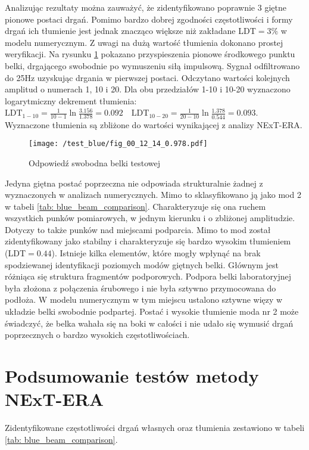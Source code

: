 Analizując rezultaty można zauważyć, że zidentyfikowano poprawnie 3 giętne pionowe postaci drgań. Pomimo bardzo dobrej zgodności częstotliwości i formy drgań ich tłumienie jest jednak znacząco większe niż zakładane LDT$=3\%$ w modelu numerycznym. Z uwagi na dużą wartość tłumienia dokonano prostej weryfikacji. Na rysunku \ref{fig: blue_beam_natural_vib} pokazano przyspieszenia pionowe środkowego punktu belki, drgającego swobodnie po wymuszeniu siłą impulsową. 
Sygnał odfiltrowano do 25Hz uzyskując drgania w pierwszej postaci. Odczytano wartości kolejnych amplitud o numerach 1, 10 i 20. Dla obu przedziałów 1-10 i 10-20 wyznaczono logarytmiczny dekrement tłumienia: $\textrm{LDT}_{1-10} = \frac{1}{10-1} \ln{\frac{3.156}{1.378}}=0.092 \quad
\textrm{LDT}_{10-20}=\frac{1}{20-10}\ln{\frac{1.378}{0.544}}=0.093$. Wyznaczone tłumienia są zbliżone do wartości wynikającej z analizy NExT-ERA.


\begin{figure}[h]
	\centering
	\texttt{[image: /test\_blue/fig\_00\_12\_14\_0.978.pdf]}
	\captionsetup{justification=centering}
	\caption{Odpowiedź swobodna belki testowej}
	\label{fig: blue_beam_natural_vib}
\end{figure}


 Jedyna giętna postać poprzeczna nie odpowiada strukturalnie żadnej z wyznaczonych w analizach numerycznych. Mimo to sklasyfikowano ją jako mod 2 w tabeli \ref{tab: blue_beam_comparison}. Charakteryzuje się ona ruchem wszystkich punków pomiarowych, w jednym kierunku i o zbliżonej amplitudzie. Dotyczy to także punków nad miejscami podparcia. Mimo to mod został zidentyfikowany jako stabilny i charakteryzuje się bardzo wysokim tłumieniem (LDT$=0.44$). Istnieje kilka elementów, które mogły wpłynąć na brak spodziewanej identyfikacji poziomych modów giętnych belki. Głównym jest różniąca się struktura fragmentów podporowych. Podpora belki laboratoryjnej była złożona z połączenia śrubowego i nie była sztywno przymocowana do podłoża. W modelu numerycznym w tym miejscu ustalono sztywne więzy w układzie belki swobodnie podpartej. Postać i wysokie tłumienie moda nr 2 może świadczyć, że belka wahała się na boki w całości i nie udało się wymusić drgań poprzecznych o bardzo wysokich częstotliwościach.

\section{Podsumowanie testów metody NExT-ERA}
Zidentyfikowane częstotliwości drgań własnych oraz tłumienia zestawiono w tabeli \ref{tab: blue_beam_comparison}. 

